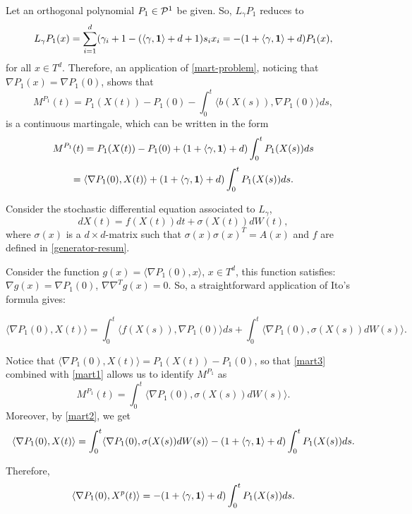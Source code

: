 \documentclass[12pt]{article}
\begin{document}
\begin{pf}
Let an orthogonal polynomial $P_1\in\mathcal{P}^1$ be given. So, $L_\gamma P_1$ reduces to
\[L_\gamma P_1(x)=\sum_{i=1}^d
(\gamma_i+1-(\langle \gamma,\mathbf{1}\rangle+d+1)s_ix_i=-(1+\langle \gamma,\mathbf{1}\rangle+d)P_1(x),\]
for all $x\in T^d$. Therefore, an application of \eqref{mart-problem}, noticing that $\nabla P_1(x)=\nabla P_1(0)$, shows that
\begin{equation}\label{mart1}
M^{P_1}(t)=P_1(X(t))-P_1(0)-\int_0^t\langle b(X(s)),\nabla P_1(0)\rangle ds,\end{equation}
is a continuous martingale, which can be written in the form
\begin{equation}\label{mart2}
M^{P_1}(t)=P_1(X(t))-P_1(0)+(1+\langle \gamma,\mathbf{1}\rangle+d)\int_0^tP_1(X(s))ds\end{equation}
\[=\langle \nabla P_1(0),X(t)\rangle+(1+\langle \gamma,\mathbf{1}\rangle+d)\int_0^tP_1(X(s))ds.\]

Consider the stochastic differential equation associated to $L_\gamma$,
\begin{equation}\label{SDE}
    dX(t)=f(X(t))dt+\sigma(X(t))dW(t),
\end{equation}
where $\sigma (x)$ is a $d\times d$-matrix such that $\sigma(x)\sigma(x)^T=A(x)$ and $f$ are defined in \eqref{generator-resum}.

Consider the function $g(x)=\langle \nabla P_1(0),x\rangle$, $x\in T^d$, this function satisfies: $\nabla g(x)=\nabla P_1(0)$, $\nabla\nabla^T g(x)=0$. So, a straightforward application of Ito's formula gives:

\begin{equation}\label{mart3}
    \langle \nabla P_1(0), X(t)\rangle=\int_0^t\langle f(X(s)),\nabla P_1(0)\rangle ds+\int_0^t\langle \nabla P_1(0),\sigma (X(s))dW(s)\rangle.\end{equation}

Notice that $\langle \nabla P_1(0),X(t)\rangle=P_1(X(t))-P_1(0)$, so that \eqref{mart3} combined with \eqref{mart1} allows us to identify $M^{P_1}$ as
\begin{equation}
    M^{P_1}(t)=\int_0^t\langle \nabla P_1(0),\sigma(X(s))dW(s)\rangle.
\end{equation}
Moreover, by \eqref{mart2}, we get
\begin{equation}
\langle \nabla P_1(0),X(t)\rangle=\int_0^t\langle \nabla P_1(0),\sigma (X(s))dW(s)\rangle-(1+\langle \gamma,\mathbf{1}\rangle+d)\int_0^tP_1(X(s))ds.
\end{equation}

Therefore,
\begin{equation}
\langle \nabla P_1(0),X^p(t)\rangle=-(1+\langle \gamma,\mathbf{1}\rangle+d)\int_0^tP_1(X(s))ds.   
\end{equation}
\end{pf}
\end{document}
